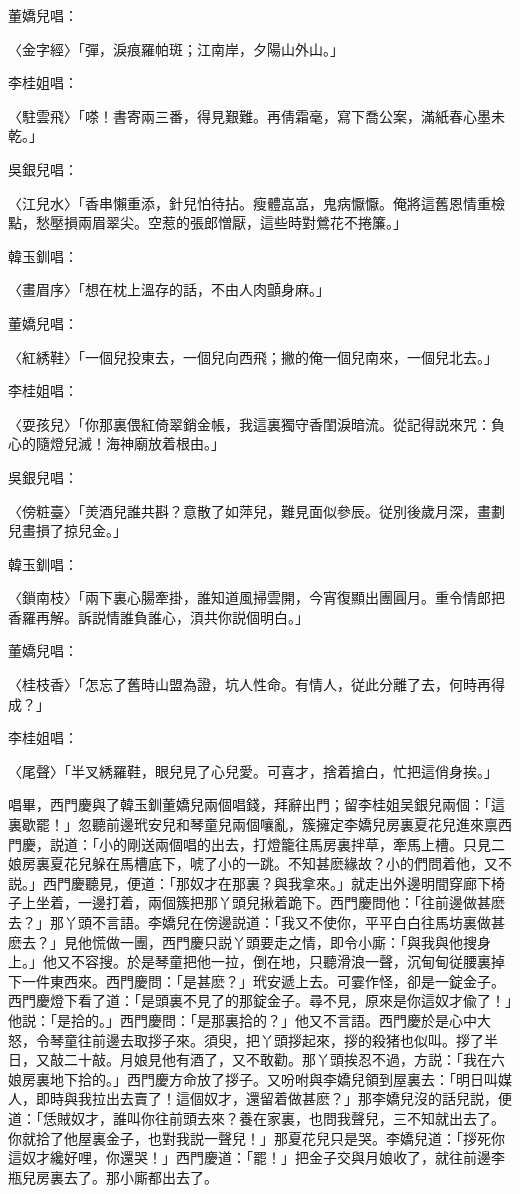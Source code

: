 董嬌兒唱：

〈金字經〉「彈，淚痕羅帕斑；江南岸，夕陽山外山。」

李桂姐唱：

〈駐雲飛〉「嗏！書寄兩三番，得見艱難。再倩霜毫，寫下喬公案，滿紙春心墨未乾。」

吳銀兒唱：

〈江兒水〉「香串懶重添，針兒怕待拈。瘦體嵓嵓，鬼病懨懨。俺將這舊恩情重檢點，愁壓損兩眉翠尖。空惹的張郎憎厭，這些時對鶯花不捲簾。」

韓玉釧唱：

〈畫眉序〉「想在枕上溫存的話，不由人肉顫身麻。」

董嬌兒唱：

〈紅綉鞋〉「一個兒投東去，一個兒向西飛；撇的俺一個兒南來，一個兒北去。」

李桂姐唱：

〈耍孩兒〉「你那裏偎紅倚翠銷金帳，我這裏獨守香閨淚暗流。從記得説來咒：負心的隨燈兒滅！海神廟放着根由。」

吳銀兒唱：

〈傍粧臺〉「羙酒兒誰共斟？意散了如萍兒，難見面似參辰。従別後歲月深，畫劃兒畫損了掠兒金。」

韓玉釧唱：

〈鎖南枝〉「兩下裏心腸牽掛，誰知道風掃雲開，今宵復顯出團圓月。重令情郎把香羅再解。訴説情誰負誰心，湏共你説個明白。」

董嬌兒唱：

〈桂枝香〉「怎忘了舊時山盟為證，坑人性命。有情人，従此分離了去，何時再得成？」

李桂姐唱：

〈尾聲〉「半叉綉羅鞋，眼兒見了心兒愛。可喜才，捨着搶白，忙把這俏身挨。」

唱畢，西門慶與了韓玉釧董嬌兒兩個唱錢，拜辭出門；留李桂姐吴銀兒兩個：「這裏歇罷！」忽聽前邊玳安兒和琴童兒兩個嚷亂，簇擁定李嬌兒房裏夏花兒進來禀西門慶，説道：「小的剛送兩個唱的出去，打燈籠往馬房裏拌草，牽馬上槽。只見二娘房裏夏花兒躲在馬槽底下，唬了小的一跳。不知甚麽緣故？小的們問着他，又不説。」西門慶聽見，便道：「那奴才在那裏？與我拿來。」就走出外邊明間穿廊下椅子上坐着，一邊打着，兩個簇把那丫頭兒揪着跪下。西門慶問他：「往前邊做甚麽去？」那丫頭不言語。李嬌兒在傍邊説道：「我又不使你，平平白白往馬坊裏做甚麽去？」見他慌做一團，西門慶只説丫頭要走之情，即令小廝：「與我與他搜身上。」他又不容搜。於是琴童把他一拉，倒在地，只聽滑浪一聲，沉甸甸従腰裏掉下一件東西來。西門慶問：「是甚麽？」玳安遞上去。可霎作怪，卻是一錠金子。西門慶燈下看了道：「是頭裏不見了的那錠金子。尋不見，原來是你這奴才偸了！」他説：「是拾的。」西門慶問：「是那裏拾的？」他又不言語。西門慶於是心中大怒，令琴童往前邊去取拶子來。須臾，把丫頭拶起來，拶的殺猪也似叫。拶了半日，又敲二十敲。月娘見他有酒了，又不敢勸。那丫頭挨忍不過，方説：「我在六娘房裏地下拾的。」西門慶方命放了拶子。又吩咐與李嬌兒領到屋裏去：「明日叫媒人，即時與我拉出去賣了！這個奴才，還留着做甚麽？」那李嬌兒沒的話兒説，便道：「恁賊奴才，誰叫你往前頭去來？養在家裏，也問我聲兒，三不知就出去了。你就拾了他屋裏金子，也對我説一聲兒！」那夏花兒只是哭。李嬌兒道：「拶死你這奴才纔好哩，你還哭！」西門慶道：「罷！」把金子交與月娘收了，就往前邊李瓶兒房裏去了。那小廝都出去了。


